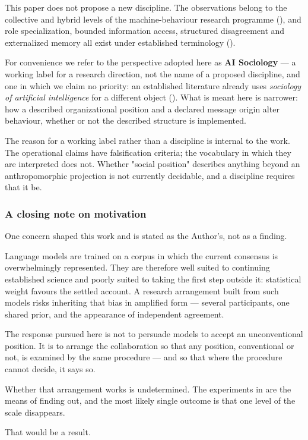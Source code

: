This paper does not propose a new discipline. The observations belong to the collective and hybrid levels of the machine-behaviour research programme (), and role specialization, bounded information access, structured disagreement and externalized memory all exist under established terminology ().

For convenience we refer to the perspective adopted here as \textbf{AI Sociology} — a working label for a research direction, not the name of a proposed discipline, and one in which we claim no priority: an established literature already uses \emph{sociology of artificial intelligence} for a different object (). What is meant here is narrower: how a described organizational position and a declared message origin alter behaviour, whether or not the described structure is implemented.

The reason for a working label rather than a discipline is internal to the work. The operational claims have falsification criteria; the vocabulary in which they are interpreted does not. Whether "social position" describes anything beyond an anthropomorphic projection is not currently decidable, and a discipline requires that it be.


\subsubsection*{A closing note on motivation}
\label{sec:en:x-a-closing-note-on-motivation}

One concern shaped this work and is stated as the Author's, not as a finding.

Language models are trained on a corpus in which the current consensus is overwhelmingly represented. They are therefore well suited to continuing established science and poorly suited to taking the first step outside it: statistical weight favours the settled account. A research arrangement built from such models risks inheriting that bias in amplified form — several participants, one shared prior, and the appearance of independent agreement.

The response pursued here is not to persuade models to accept an unconventional position. It is to arrange the collaboration so that any position, conventional or not, is examined by the same procedure — and so that where the procedure cannot decide, it says so.

Whether that arrangement works is undetermined. The experiments in  are the means of finding out, and the most likely single outcome is that one level of the scale disappears.

That would be a result.
